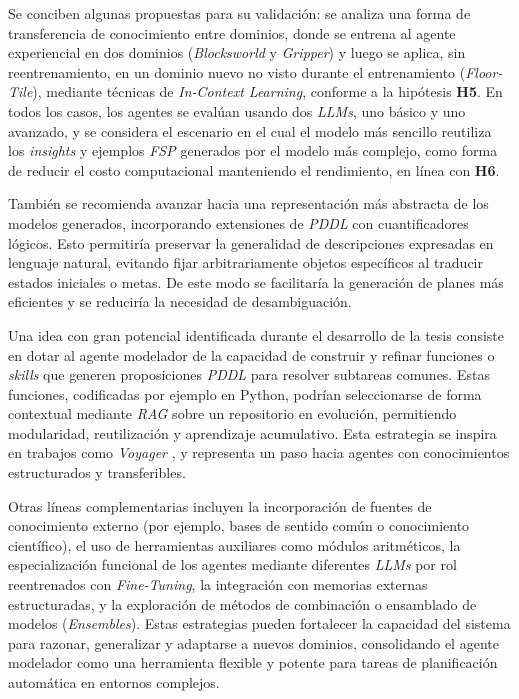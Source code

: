 \begin{recomendations}
Se conciben algunas propuestas para su validación: se analiza una forma de transferencia de conocimiento entre dominios, donde se entrena al agente experiencial en dos dominios (\textit{Blocksworld} y \textit{Gripper}) y luego se aplica, sin reentrenamiento, en un dominio nuevo no visto durante el entrenamiento (\textit{Floor-Tile}), mediante técnicas de \textit{In-Context Learning}, conforme a la hipótesis \textbf{H5}. En todos los casos, los agentes se evalúan usando dos \textit{LLMs}, uno básico y uno avanzado, y se considera el escenario en el cual el modelo más sencillo reutiliza los \textit{insights} y ejemplos \textit{FSP} generados por el modelo más complejo, como forma de reducir el costo computacional manteniendo el rendimiento, en línea con \textbf{H6}.

También se recomienda avanzar hacia una representación más abstracta de los modelos generados, incorporando extensiones de \textit{PDDL} con cuantificadores lógicos. Esto permitiría preservar la generalidad de descripciones expresadas en lenguaje natural, evitando fijar arbitrariamente objetos específicos al traducir estados iniciales o metas. De este modo se facilitaría la generación de planes más eficientes y se reduciría la necesidad de desambiguación.

Una idea con gran potencial identificada durante el desarrollo de la tesis consiste en dotar al agente modelador de la capacidad de construir y refinar funciones o \textit{skills} que generen proposiciones \textit{PDDL} para resolver subtareas comunes. Estas funciones, codificadas por ejemplo en Python, podrían seleccionarse de forma contextual mediante \textit{RAG} sobre un repositorio en evolución, permitiendo modularidad, reutilización y aprendizaje acumulativo. Esta estrategia se inspira en trabajos como \textit{Voyager} \parencite{wang2023voyager}, y representa un paso hacia agentes con conocimientos estructurados y transferibles.

Otras líneas complementarias incluyen la incorporación de fuentes de conocimiento externo (por ejemplo, bases de sentido común o conocimiento científico), el uso de herramientas auxiliares como módulos aritméticos, la especialización funcional de los agentes mediante diferentes \textit{LLMs} por rol reentrenados con \textit{Fine-Tuning}, la integración con memorias externas estructuradas, y la exploración de métodos de combinación o ensamblado de modelos (\textit{Ensembles}). Estas estrategias pueden fortalecer la capacidad del sistema para razonar, generalizar y adaptarse a nuevos dominios, consolidando el agente modelador como una herramienta flexible y potente para tareas de planificación automática en entornos complejos.
\end{recomendations}
